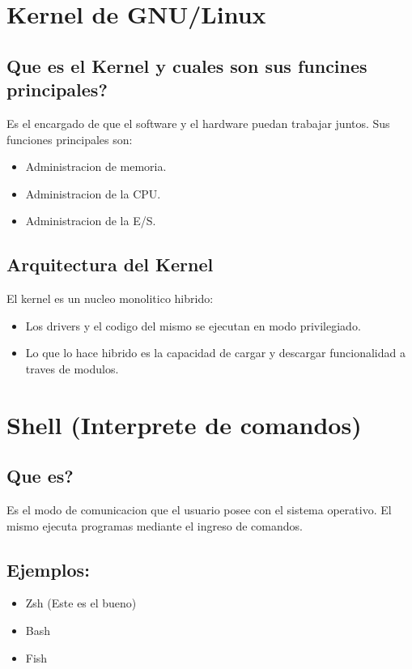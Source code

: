 \documentclass[11pt]{article}
\begin{document}
\section{Kernel de GNU/Linux}
\subsection{Que es el Kernel y cuales son sus funcines principales?}
Es el encargado de que el software y el hardware puedan trabajar juntos.
Sus funciones principales son:
\begin{itemize}
    \item Administracion de memoria.
    \item Administracion de la CPU.
    \item Administracion de la E/S.
\end{itemize}

\subsection{Arquitectura del Kernel}
El kernel es un nucleo monolitico hibrido:
\begin{itemize}
    \item Los drivers y el codigo del mismo se ejecutan en modo privilegiado.
    \item Lo que lo hace hibrido es la capacidad de cargar y descargar funcionalidad a traves de modulos.
\end{itemize}

\section{Shell (Interprete de comandos)}
\subsection{Que es?}
Es el modo de comunicacion que el usuario posee con el sistema operativo. El mismo ejecuta programas mediante el ingreso de comandos.

\subsection{Ejemplos:}
\begin{itemize}
    \item Zsh (Este es el bueno)
    \item Bash
    \item Fish
\end{itemize}
\end{document}
